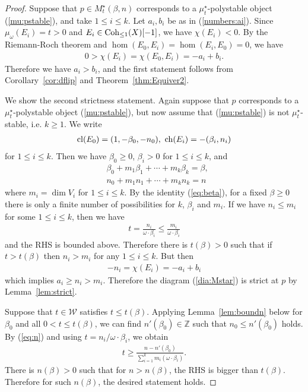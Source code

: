 \documentclass[11pt]{amsart}
\theoremstyle{plain}
\theoremstyle{definition}
\theoremstyle{remark}
\newcommand{\wW}{\mathcal{W}}
\newcommand{\ch}{\mathop{\rm ch}\nolimits}
\newcommand{\Coh}{\mathop{\rm Coh}\nolimits}
\newcommand{\cl}{\mathop{\rm cl}\nolimits}
\begin{document}
\begin{proof}
Suppose that $p \in M_{t}^{\star}(\beta, n)$ 
corresponds to  
a $\mu_t^{\star}$-polystable object (\ref{mu:pstable}), 
and take $1\le i\le k$. Let 
$a_i, b_i$ be as in (\ref{numbers:ai}).  
Since $\mu_{\omega}(E_i)=t>0$ 
and $E_i \in \Coh_{\le 1}(X)[-1]$, 
we have $\chi(E_i)<0$. 
By the Riemann-Roch theorem and 
$\hom(E_0, E_i)=\hom(E_i, E_0)=0$, we have 
\begin{align*}
0>\chi(E_i)=\chi(E_0, E_i)=-a_i+b_i.
\end{align*}
Therefore we have $a_i>b_i$, and 
the first statement follows from 
Corollary~\ref{cor:dflip} and Theorem~\ref{thm:Equiver2}. 

We show the second strictness statement. 
Again suppose that $p$ 
corresponds to a $\mu_t^{\star}$-polystable object (\ref{mu:pstable}), 
but now assume that (\ref{mu:pstable}) is not $\mu_t^{\star}$-stable, i.e. 
$k\ge 1$. 
We write 
\begin{align*}
\cl(E_0)=(1, -\beta_0, -n_0), \ \ch(E_i)=-(\beta_i, n_i)
\end{align*}
for $1\le i\le k$. 
Then we have $\beta_0 \ge 0$, $\beta_i>0$ for $1\le i\le k$, and 
\begin{align}\label{eq:beta}
&\beta_0+m_1 \beta_1+\cdots+m_k \beta_k=\beta, \\ 
\label{eq:n}
&n_0+m_1 n_1+\cdots + m_k n_k=n
\end{align}
where $m_i=\dim V_i$ for $1\le i\le k$. 
By the identity (\ref{eq:beta}), for a fixed $\beta \ge 0$ there is only 
a finite number of possibilities for $k$, $\beta_i$ and $m_i$. 
If we have $n_i \le m_i$ for some $1\le i\le k$, then we have
\begin{align*}
t=\frac{n_i}{\omega \cdot \beta_i} \le \frac{m_i}{\omega \cdot \beta_i}
\end{align*}
and the RHS is bounded above. 
Therefore there is $t(\beta)>0$ such that if $t>t(\beta)$
then $n_i>m_i$ for any $1\le i\le k$. 
But then 
\begin{align*}
-n_i=\chi(E_i)=-a_i+b_i
\end{align*}
which implies $a_i \ge n_i>m_i$. 
Therefore the 
diagram (\ref{dia:Mstar}) is strict at $p$ by 
Lemma~\ref{lem:strict}. 

Suppose that $t \in \wW$ satisfies $t \le t(\beta)$. 
Applying Lemma~\ref{lem:boundn} below
for $\beta_0$ and all $0<t \le t(\beta)$, 
we can find $n'(\beta_0) \in \mathbb{Z}$ such that 
$n_0\le n'(\beta_0)$ holds. 
By (\ref{eq:n}) and using $t=n_i/\omega \cdot \beta_i$, we 
obtain
\begin{align*}
t \ge \frac{n-n'(\beta_0)}{\sum_{i=1}^k m_i (\omega \cdot \beta_i)}.
\end{align*}
There is $n(\beta)>0$ such that for $n>n(\beta)$, 
the RHS is bigger than $t(\beta)$. 
Therefore for such $n(\beta)$, the desired statement holds. 
\end{proof}
\end{document}
